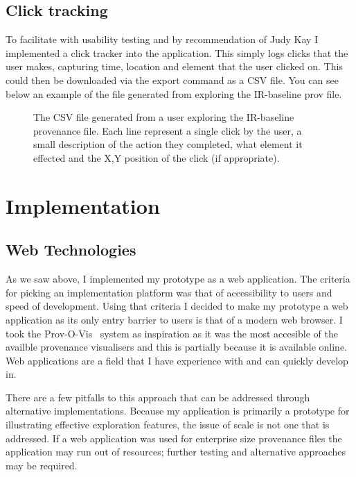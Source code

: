 \subsection{Click tracking}
\label{sec:click_tracker}

To facilitate with usability testing and by recommendation of Judy Kay I implemented a click tracker into the application. This simply logs clicks that the user makes, capturing time, location and element that the user clicked on. This could then be downloaded via the export command as a CSV file.  You can see below an example of the file generated from exploring the IR-baseline prov file.


\begin{figure}[h]
	\centering
	
	\caption{The CSV file generated from a user exploring the IR-baseline provenance file. Each line represent a single click by the user, a small description of the action they completed, what element it effected and the X,Y position of the click (if appropriate).}
	\label{fig:clickfile}
\end{figure}

\section{Implementation}

\subsection{Web Technologies}
\label{sec:web_technologies}

As we saw above, I implemented my prototype as a web application. The criteria for picking an implementation platform was that of accessibility to users and speed of development. Using that criteria I decided to make my prototype a web application as its only entry barrier to users is that of a modern web browser. I took the Prov-O-Vis~\cite{Hoekstra2014} system as inspiration as it was the most accesible of the availble provenance visualisers and this is partially because it is available online. Web applications are a field that I have experience with and can quickly develop in. 

There are a few pitfalls to this approach that can be addressed through alternative implementations. Because my application is primarily a prototype for illustrating effective exploration features, the issue of scale is not one that is addressed. If a web application was used for enterprise size provenance files the application may run out of resources; further testing and alternative approaches may be required.

